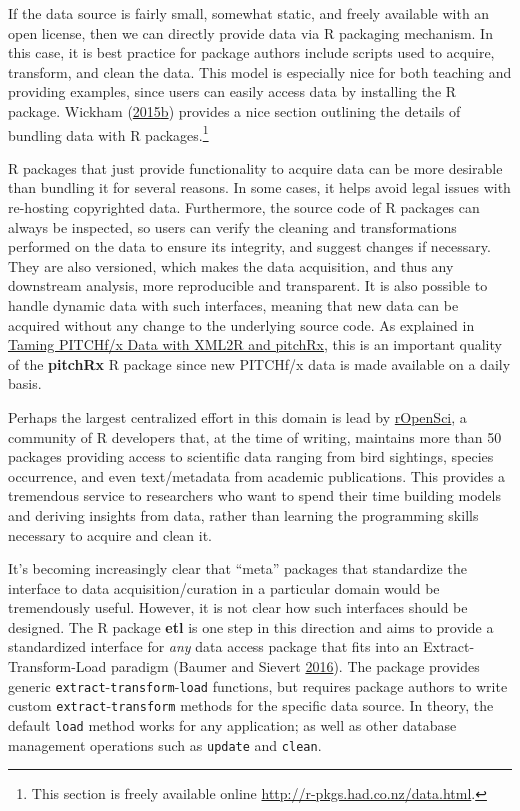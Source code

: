 \documentclass[12pt,]{isuthesis}
\let\rmarkdownfootnote\footnote%
\def\footnote{\protect\rmarkdownfootnote}
\begin{document}
If the data source is fairly small, somewhat static, and freely
available with an open license, then we can directly provide data via R
packaging mechanism. In this case, it is best practice for package
authors include scripts used to acquire, transform, and clean the data.
This model is especially nice for both teaching and providing examples,
since users can easily access data by installing the R package. Wickham
(\protect\hyperlink{ref-rpkgs}{2015}\protect\hyperlink{ref-rpkgs}{b})
provides a nice section outlining the details of bundling data with R
packages.\footnote{This section is freely available online
  \url{http://r-pkgs.had.co.nz/data.html}.}

R packages that just provide functionality to acquire data can be more
desirable than bundling it for several reasons. In some cases, it helps
avoid legal issues with re-hosting copyrighted data. Furthermore, the
source code of R packages can always be inspected, so users can verify
the cleaning and transformations performed on the data to ensure its
integrity, and suggest changes if necessary. They are also versioned,
which makes the data acquisition, and thus any downstream analysis, more
reproducible and transparent. It is also possible to handle dynamic data
with such interfaces, meaning that new data can be acquired without any
change to the underlying source code. As explained in
\protect\hyperlink{taming-pitchfx-data-with-xml2r-and-pitchrx}{Taming
PITCHf/x Data with XML2R and pitchRx}, this is an important quality of
the \textbf{pitchRx} R package since new PITCHf/x data is made available
on a daily basis.

Perhaps the largest centralized effort in this domain is lead by
\href{https://ropensci.org}{rOpenSci}, a community of R developers that,
at the time of writing, maintains more than 50 packages providing access
to scientific data ranging from bird sightings, species occurrence, and
even text/metadata from academic publications. This provides a
tremendous service to researchers who want to spend their time building
models and deriving insights from data, rather than learning the
programming skills necessary to acquire and clean it.

It's becoming increasingly clear that ``meta'' packages that standardize
the interface to data acquisition/curation in a particular domain would
be tremendously useful. However, it is not clear how such interfaces
should be designed. The R package \textbf{etl} is one step in this
direction and aims to provide a standardized interface for \emph{any}
data access package that fits into an Extract-Transform-Load paradigm
(Baumer and Sievert \protect\hyperlink{ref-etl}{2016}). The package
provides generic \texttt{extract}-\texttt{transform}-\texttt{load}
functions, but requires package authors to write custom
\texttt{extract}-\texttt{transform} methods for the specific data
source. In theory, the default \texttt{load} method works for any
application; as well as other database management operations such as
\texttt{update} and \texttt{clean}.
\end{document}
